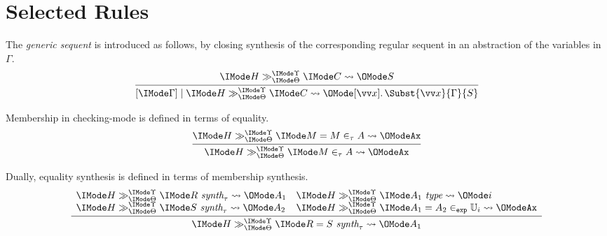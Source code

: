 \section{Selected Rules}

The \emph{generic sequent} is introduced as follows, by closing synthesis of the corresponding
regular sequent in an abstraction of the variables in $\Gamma$.
\[
  \infer{
    \GenericPRLSequent{\Gamma}{H}{\Theta}{\Upsilon}{C}{
      \MkAbs{}{\vec{x}}{\Subst{\vec{x}}{\Gamma}{S}}
    }
  }{
    \PRLSequent{H}{\Theta}{\Upsilon}{C}{S}
  }
\]

Membership in checking-mode is defined in terms of equality.
\[
  \infer{
    \PRLSequent{H}{\Theta}{\Upsilon}{M \in_\tau A}{\mathtt{Ax}}
  }{
    \PRLSequent{H}{\Theta}{\Upsilon}{M = M \in_\tau A}{\mathtt{Ax}}
  }
\]

Dually, equality synthesis is defined in terms of membership synthesis.
\[
  \infer{
    \PRLSequent{H}{\Theta}{\Upsilon}{R = S\ \textit{synth}_\tau}{A_1}
  }{
    \begin{array}{l}
      \PRLSequent{H}{\Theta}{\Upsilon}{R\ \textit{synth}_\tau}{A_1}\\
      \PRLSequent{H}{\Theta}{\Upsilon}{S\ \textit{synth}_\tau}{A_2}
    \end{array}
    \begin{array}{l}
      \PRLSequent{H}{\Theta}{\Upsilon}{A_1\ \textit{type}}{i}\\
      \PRLSequent{H}{\Theta}{\Upsilon}{A_1=A_2\in_\AbtSortExp \mathbb{U}_i}{\mathtt{Ax}}
    \end{array}
  }
\]

